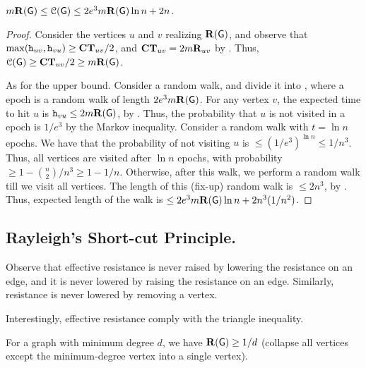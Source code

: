 \begin{theorem}
    $m \mathbf{R}(\mathsf{G}) \leq \EuScript{C}(\mathsf{G}) \leq 2 e^3 m
    \mathbf{R}(\mathsf{G}) \ln n + 2n$.
\end{theorem}

\begin{proof}
    Consider the vertices $u$ and $v$ realizing $\mathbf{R}(\mathsf{G})$,
    and observe that $\max(\mathtt{h}_{uv}, \mathtt{h}_{vu}) \geq
    \mathbf{CT}_{uv}/2$, and $\mathbf{CT}_{uv} =
    2m\mathbf{R}_{uv}$ by . Thus,
    $\EuScript{C}(\mathsf{G}) \geq \mathbf{CT}_{uv}/2 \geq m
    \mathbf{R}(\mathsf{G})$.

    As for the upper bound. Consider a random walk, and divide it into
    , where a epoch is a random walk of length
    $2e^3 m \mathbf{R}(\mathsf{G})$. For any vertex $v$, the expected
    time to hit $u$ is
    $\mathtt{h}_{vu} \leq 2 m \mathbf{R}(\mathsf{G})$, by
    . Thus, the probability that $u$ is not visited in
    a epoch is $1/e^3$ by the Markov inequality. Consider a random
    walk with $t=\ln n$ epochs. We have that the probability of not
    visiting $u$ is $\leq (1/e^3)^{\ln n} \leq 1/n^3$. Thus, all
    vertices are visited after $\ln n$ epochs, with probability
    $\geq 1 - \binom{n}{2}/n^3 \geq 1- 1/n$.  Otherwise, after this
    walk, we perform a random walk till we visit all vertices.  The
    length of this (fix-up) random walk is $\leq 2n^3$, by
    . Thus, expected length of the walk is
    $\leq 2 e^3 m \mathbf{R}(\mathsf{G}) \ln n + 2n^3(1/n^2)$.
\end{proof}


\subsection{Rayleigh's Short-cut Principle.}

Observe that effective resistance is never raised by lowering the
resistance on an edge, and it is never lowered by raising the
resistance on an edge. Similarly, resistance is never lowered by
removing a vertex.

Interestingly, effective resistance comply with the triangle
inequality.

\begin{observation}
    For a graph with minimum degree $d$, we have $\mathbf{R}(\mathsf{G}) \geq
    1/d$ (collapse all vertices except the minimum-degree vertex into
    a single vertex).
\end{observation}

